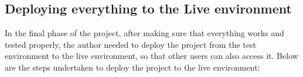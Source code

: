 \begin{multicols}{2}








      \section{Deploying everything to the Live environment}

      In the final phase of the project, after making sure that everything works and tested properly, the author needed to deploy the project
      from the test environment to the live environment, so that other users can also access it. Below are the steps undertaken to deploy the
      project to the live environment:


\end{multicols}
